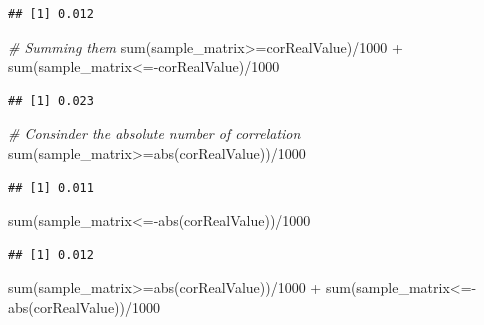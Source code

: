 \documentclass[
  notitlepage,
  onecolumn,
  openany]{book}
\newenvironment{Shaded}{\begin{snugshade}}{\end{snugshade}}
\newcommand{\CommentTok}[1]{\textcolor[rgb]{0.56,0.35,0.01}{\textit{#1}}}
\newcommand{\DecValTok}[1]{\textcolor[rgb]{0.00,0.00,0.81}{#1}}
\newcommand{\FunctionTok}[1]{\textcolor[rgb]{0.00,0.00,0.00}{#1}}
\newcommand{\NormalTok}[1]{#1}
\newcommand{\SpecialCharTok}[1]{\textcolor[rgb]{0.00,0.00,0.00}{#1}}
\begin{document}
\begin{verbatim}
## [1] 0.012
\end{verbatim}

\begin{Shaded}
\begin{Highlighting}[]
\CommentTok{\# Summing them}
\FunctionTok{sum}\NormalTok{(sample\_matrix}\SpecialCharTok{\textgreater{}=}\NormalTok{corRealValue)}\SpecialCharTok{/}\DecValTok{1000} \SpecialCharTok{+} \FunctionTok{sum}\NormalTok{(sample\_matrix}\SpecialCharTok{\textless{}={-}}\NormalTok{corRealValue)}\SpecialCharTok{/}\DecValTok{1000}
\end{Highlighting}
\end{Shaded}

\begin{verbatim}
## [1] 0.023
\end{verbatim}

\begin{Shaded}
\begin{Highlighting}[]
\CommentTok{\# Consinder the absolute number of correlation}
\FunctionTok{sum}\NormalTok{(sample\_matrix}\SpecialCharTok{\textgreater{}=}\FunctionTok{abs}\NormalTok{(corRealValue))}\SpecialCharTok{/}\DecValTok{1000}
\end{Highlighting}
\end{Shaded}

\begin{verbatim}
## [1] 0.011
\end{verbatim}

\begin{Shaded}
\begin{Highlighting}[]
\FunctionTok{sum}\NormalTok{(sample\_matrix}\SpecialCharTok{\textless{}={-}}\FunctionTok{abs}\NormalTok{(corRealValue))}\SpecialCharTok{/}\DecValTok{1000}
\end{Highlighting}
\end{Shaded}

\begin{verbatim}
## [1] 0.012
\end{verbatim}

\begin{Shaded}
\begin{Highlighting}[]
\FunctionTok{sum}\NormalTok{(sample\_matrix}\SpecialCharTok{\textgreater{}=}\FunctionTok{abs}\NormalTok{(corRealValue))}\SpecialCharTok{/}\DecValTok{1000} \SpecialCharTok{+} \FunctionTok{sum}\NormalTok{(sample\_matrix}\SpecialCharTok{\textless{}={-}}\FunctionTok{abs}\NormalTok{(corRealValue))}\SpecialCharTok{/}\DecValTok{1000}
\end{Highlighting}
\end{Shaded}
\end{document}
